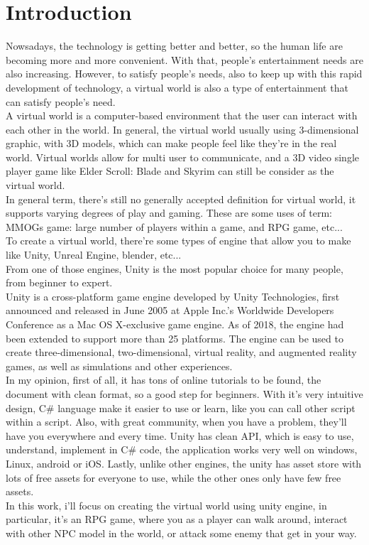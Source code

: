 \documentclass[a4paper, 13pt]{extarticle}
\begin{document}
\section{\Large Introduction} 
Nowsadays, the technology is getting better and better, so the human life are becoming more and more convenient. With that, people's entertainment needs are also increasing. However, to satisfy people's needs, also to keep up with this rapid development of technology, a virtual world is also a type of entertainment that can satisfy people's need. \\[0.35cm]  A virtual world is a computer-based environment that the user can interact with each other in the world. In general, the virtual world usually using 3-dimensional graphic, with 3D models, which can make people feel like they're in the real world. Virtual worlds allow for multi user to communicate, and a 3D video single player game like Elder Scroll: Blade and Skyrim can still be consider as the virtual world. \\[0.35cm] In general term, there's still no generally accepted definition for virtual world, it supports varying degrees of play and gaming. These are some uses of term: MMOGs game: large number of players within a game, and RPG game, etc... \\[0.35cm] To create a virtual world, there're some types of engine that allow you to make like Unity, Unreal Engine, blender, etc... \\[0.35cm] From one of those engines, Unity is the most popular choice for many people, from beginner to expert. \\[0.35cm] Unity is a cross-platform game engine developed by Unity Technologies, first announced and released in June 2005 at Apple Inc.'s Worldwide Developers Conference as a Mac OS X-exclusive game engine. As of 2018, the engine had been extended to support more than 25 platforms. The engine can be used to create three-dimensional, two-dimensional, virtual reality, and augmented reality games, as well as simulations and other experiences. \\[0.35cm]
 In my opinion, first of all, it has tons of online tutorials to be found, the document with clean format, so a good step for beginners. With it's very intuitive design, C\# language make it easier to use or learn, like you can call other script within a script. Also, with great community, when you have a problem, they'll have you everywhere and every time. Unity has clean API, which is easy to use, understand, implement in C\# code, the application works very well on windows, Linux, android or iOS. Lastly, unlike other engines, the unity has asset store with lots of free assets for everyone to use, while the other ones only have few free assets. \\[0.35cm]In this work, i'll focus on creating the virtual world using unity engine, in particular, it's an RPG game, where you as a player can walk around, interact with other NPC model in the world, or attack some enemy that get in your way. 
  
\end{document}
